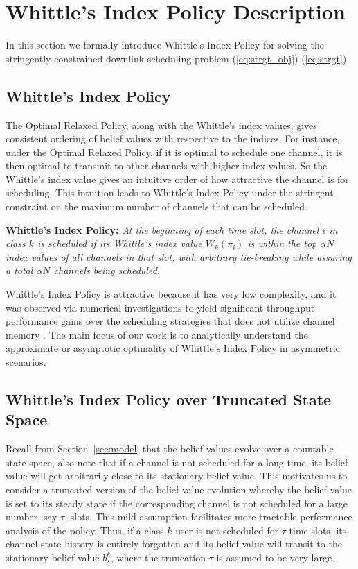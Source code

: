 \documentclass[11pt,twocolumn]{IEEEtran}
\begin{document}
\section{Whittle's Index Policy Description}
\label{sec:num:index}

In this section we formally introduce Whittle's Index Policy for
solving the stringently-constrained downlink scheduling problem
(\ref{eq:strgt_obj})-(\ref{eq:strgt}).



\subsection{Whittle's Index Policy}
The Optimal Relaxed Policy, along with the Whittle's index values,
gives consistent ordering of belief values with respective to the
indices. For instance, under the Optimal Relaxed Policy, if it is
optimal to schedule one channel, it is then optimal to transmit to
other channels with higher index values. So the Whittle's index
value gives an intuitive order of how attractive the channel is for
scheduling. This intuition leads to Whittle's Index Policy
\cite{Zhao_index} under the stringent constraint on the maximum number of
channels that can be scheduled.

\vspace{3pt}
\noindent\textbf{Whittle's Index Policy:} \emph{At the beginning of each time slot, the channel $i$ in class $k$ is scheduled if its Whittle's index value $W_k(\pi_i)$ is within the top $\alpha N$ index values of all channels in that slot, with arbitrary tie-breaking while assuring a total $\alpha N$ channels being scheduled.}
\vspace{2pt}

Whittle's Index Policy is attractive because it has very low
complexity, and it was observed via numerical investigations to
yield significant throughput performance gains over the scheduling
strategies that does not utilize channel memory \cite{Infocom11}.
The main focus of our work is to analytically understand the approximate or asymptotic optimality of Whittle's Index Policy in asymmetric scenarios.

\subsection{Whittle's Index Policy over Truncated State Space}

Recall from Section~\ref{sec:model} that the belief values evolve over a countable
state space, also note that if a channel is not scheduled for a long time, its
belief value will get arbitrarily close to its stationary belief
value. This motivates us to consider a truncated version of the
belief value evolution whereby the belief value is set to its steady
state if the corresponding channel is not scheduled for a large
number, say $\tau$, slots. This mild assumption facilitates more
tractable performance analysis of the policy.  Thus,
if a class $k$ user is not scheduled for $\tau$ time slots, its channel state
history is entirely forgotten and its belief value will transit to
the stationary belief value $b_s^k$, where the truncation $\tau$ is assumed
to be very large.
\end{document}
